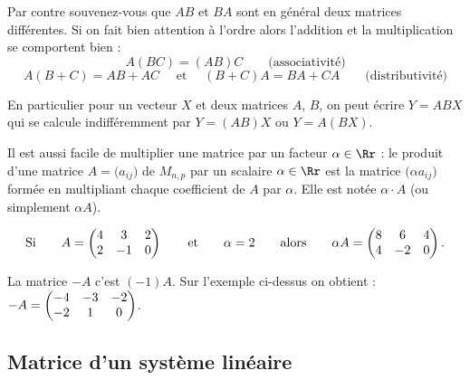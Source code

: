 \documentclass[11pt,class=report,crop=false]{standalone}
\begin{document}
Par contre souvenez-vous que $AB$ et $BA$ sont en général deux matrices différentes. 
Si on fait bien attention à l'ordre alors l'addition et la multiplication se comportent bien :
$$A (BC) = (AB) C  \qquad \text{(associativité)}$$
$$A(B+C) = AB + AC \quad \text{ et } \quad  (B+C) A = BA + CA \qquad \text{(distributivité)}$$

En particulier pour un vecteur $X$ et deux matrices $A$, $B$, on peut écrire $Y = ABX$ qui se calcule indifféremment par 
$Y = (AB) X$ ou $Y = A(BX)$.




Il est aussi facile de multiplier une matrice par un facteur $\alpha \in \Rr$ :
le produit d'une matrice $A=\big(a_{ij}\big)$ de $M_{n,p}$
	par un scalaire $\alpha \in \Rr$ est la matrice
	$\big(\alpha a_{ij}\big)$ formée en
	multipliant chaque coefficient de $A$ par $\alpha$. Elle est notée $\alpha \cdot A$ (ou simplement $\alpha A$).

\begin{exemple}
	$$
	\text{Si} \qquad
	A  = \begin{pmatrix}
		4& 3 & 2\cr
		2& -1& 0\cr
	\end{pmatrix}
	\qquad \text{et} \qquad \alpha = 2
	\qquad \text{alors} \qquad
	\alpha A =
	\begin{pmatrix}
		8& 6 & 4\cr
		4& -2& 0\cr
	\end{pmatrix}.$$

La matrice $-A$ c'est $(-1)A$. Sur l'exemple ci-dessus on obtient :
$-A  = \begin{pmatrix}
	-4& -3 & -2\cr
	-2& 1& 0\cr
\end{pmatrix}$.

\end{exemple}


\subsection{Matrice d'un système linéaire}
\end{document}
